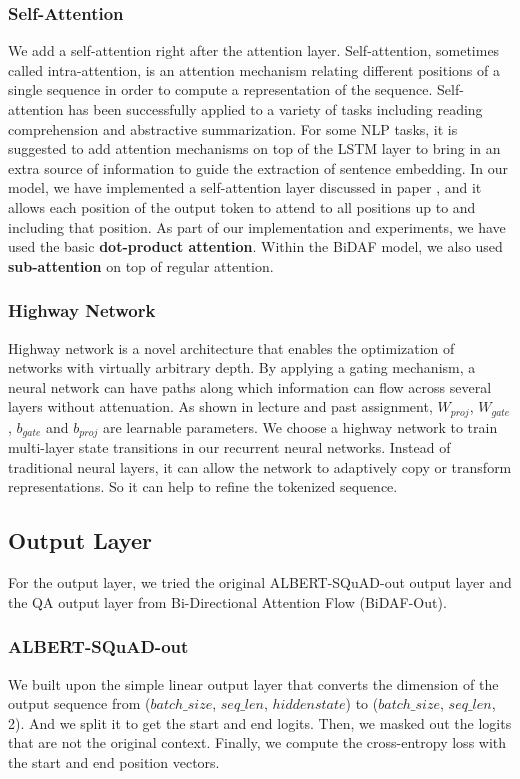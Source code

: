 \documentclass{article}
\begin{document}
\subsubsection{Self-Attention}
We add a self-attention right after the attention layer. Self-attention, sometimes called intra-attention, is an attention mechanism relating different positions of a single sequence in order to compute a representation of the sequence. \citep{attention} Self-attention has been successfully applied to a variety of tasks including reading comprehension and abstractive summarization. For some NLP tasks, it is suggested to add attention mechanisms on top of the LSTM layer to bring in an extra source of information to guide the extraction of sentence embedding. In our model, we have implemented a self-attention layer discussed in paper \citep{attention}, and it allows each position of the output token to attend to all positions up to and including that position. As part of our implementation and experiments, we have used the basic \textbf{dot-product attention}. Within the BiDAF model, we also used \textbf{sub-attention} on top of regular attention.

\subsubsection{Highway Network} \label{highway-network}
Highway network is a novel architecture that enables the optimization of networks with virtually arbitrary depth. By applying a gating mechanism, a neural network can have paths along which information can flow across several layers without attenuation. As shown in lecture and past assignment, $W_{proj}$, $W_{gate}$, $b_{gate}$ and $b_{proj}$ are learnable parameters. We choose a highway network to train multi-layer state transitions in our recurrent neural networks. Instead of traditional neural layers, it can allow the network to adaptively copy or transform representations. So it can help to refine the tokenized sequence. \citep{highway} \citep{modules} 



\subsection{Output Layer}
For the output layer, we tried the original ALBERT-SQuAD-out output layer and the QA output layer from Bi-Directional Attention Flow (BiDAF-Out).

\subsubsection{ALBERT-SQuAD-out} \label{albert_squad_out}
We built upon the simple linear output layer that converts the dimension of the output sequence from ($batch\_size$, $seq\_len$, $hiddenstate$) to ($batch\_size$, $seq\_len$, 2). And we split it to get the start and end logits. Then, we masked out the logits that are not the original context. Finally, we compute the cross-entropy loss with the start and end position vectors.
\end{document}
